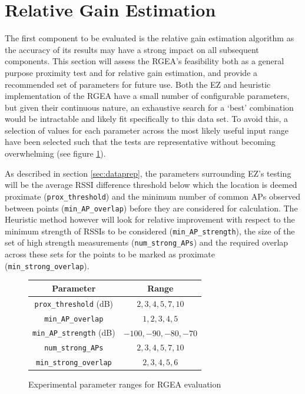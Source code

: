 \documentclass{UoYCSproject}
\begin{document}
	    \section{Relative Gain Estimation}
	    \label{sec:rgeaeval}
        
            The first component to be evaluated is the relative gain estimation algorithm as the accuracy of its results may have a strong impact on all subsequent components. This section will assess the RGEA's feasibility both as a general purpose proximity test and for relative gain estimation, and provide a recommended set of parameters for future use. Both the EZ and heuristic implementation of the RGEA have a small number of configurable parameters, but given their continuous nature, an exhaustive search for a `best' combination would be intractable and likely fit specifically to this data set. To avoid this, a selection of values for each parameter across the most likely useful input range have been selected such that the tests are representative without becoming overwhelming (see figure \ref{fig:rgeaparams}).
            
            \begin{sloppypar}
            As described in section \ref{sec:dataprep}, the parameters surrounding EZ's testing will be the average RSSI difference threshold below which the location is deemed proximate (\texttt{prox\_threshold}) and the minimum number of common APs observed between points (\texttt{min\_AP\_overlap}) before they are considered for calculation. The Heuristic method however will look for relative improvement with respect to the minimum strength of RSSIs to be considered (\texttt{min\_AP\_strength}), the size of the set of high strength measurements (\texttt{num\_strong\_APs}) and the required overlap across these sets for the points to be marked as proximate (\texttt{min\_strong\_overlap}).
            \end{sloppypar}
            
            \begin{figure}
                \label{fig:rgeaparams}
                \centering
                \begin{tabular}[h]{| c | c |}
                    \hline
                    Parameter & Range \\ \hline
                    \texttt{prox\_threshold} (dB) & $2, 3, 4, 5, 7, 10$ \\
                    \texttt{min\_AP\_overlap} & $1, 2, 3, 4, 5$ \\ \hline
                    \texttt{min\_AP\_strength} (dB) & $-100, -90, -80, -70$ \\
                    \texttt{num\_strong\_APs} & $2, 3, 4, 5, 7, 10$ \\
                    \texttt{min\_strong\_overlap} & $2, 3, 4, 5, 6$ \\ \hline
                \end{tabular}
                \caption{Experimental parameter ranges for RGEA evaluation}
            \end{figure}
            
\end{document}

